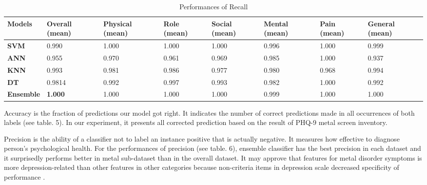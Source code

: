 \documentclass[12pt]{article}
\begin{document}
\begin{table}[ht]
\begin{adjustwidth}{-1.5cm}{}
\begin{tabular}{|C{2cm}|C{1.5cm}|C{2cm}|C{1.5cm}|C{1.5cm}|C{1.5cm}|C{1.5cm}|C{2cm}|}
\hline
{} 
{\color[HTML]{333333} \textbf{Models}} & {\color[HTML]{333333} \textbf{Overall (mean)}} & {\color[HTML]{333333} \textbf{Physical (mean)}} & {\color[HTML]{333333} \textbf{Role (mean)}} &{\color[HTML]{333333} \textbf{Social (mean)}} & {\color[HTML]{333333} \textbf{Mental (mean)}} & {\color[HTML]{333333} \textbf{Pain (mean)}} & {\color[HTML]{333333} \textbf{General (mean)}} \\ \hline
{} 
\textbf{SVM} & 0.990 & 1.000  & 1.000  & 1.000  & 0.996   & 1.000   & 0.999    \\ \hline
{} 
\textbf{ANN}   & 0.955 & 0.970  & 0.961  & 0.969  & 0.985  & 1.000  & 0.937     \\ \hline
{} 
\textbf{KNN}  & 0.993 & 0.981  & 0.986  & 0.977 & 0.980 & 0.968  & 0.994      \\ \hline
{} 
\textbf{DT}  & 0.9814 & 0.992  & 0.997  & 0.993 & 0.982  & 1.000  & 0.992    \\ \hline
{} 
\textbf{Ensemble}   & \textbf{1.000} & 1.000 & 1.000  & 1.000  & 0.999  & 1.000 & 1.000   \\ \hline
\end{tabular}
\caption{Performances of Recall}
\label{Recall}
\end{adjustwidth}
\end{table}

Accuracy is the fraction of predictions our model got right. It indicates the number of correct predictions made in all occurrences of both labels (see table. 5). In our experiment, it presents all corrected prediction based on the result of PHQ-9 metal screen inventory.

Precision is the ability of a classifier not to label an instance positive that is actually negative. It measures how effective to diagnose person's psychological health. For the performances of precision (see table. 6), ensemble classifier has the best precision in each dataset and it surprisedly performs better in metal sub-dataset than in the overall dataset. It may approve that features for metal disorder symptoms is more depression-related than other features in other categories because non-criteria items in depression scale decreased specificity of performance \cite{Zimmerman}.
\end{document}
